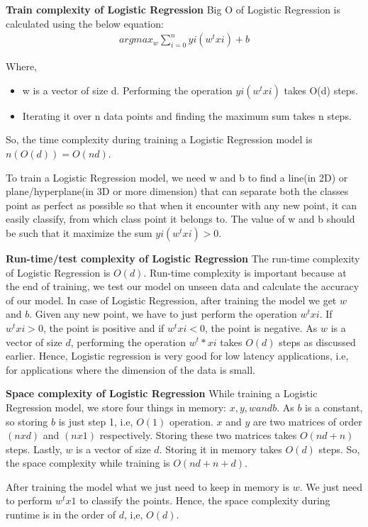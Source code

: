 \documentclass[11pt,english]{article}
\begin{document}
\begin{flushleft}
\textbf{Train complexity of Logistic Regression}
Big O of Logistic Regression is calculated using the below equation:
\begin{align}
    argmax_w\sum_{i=0}^n yi(w^t xi)+b \nonumber
\end{align}

Where,
\begin{itemize}
  \addtolength{\itemindent}{.5cm}
    \item w is a vector of size d. Performing the operation $yi(w^t xi)$ takes O(d) steps.
    \item Iterating it over n data points and finding the maximum sum takes n steps.
\end{itemize}

So, the time complexity during training a Logistic Regression model is $n(O(d))=O(nd)$.\newline

To train a Logistic Regression model, we need w and b to find a line(in 2D) or plane/hyperplane(in 3D or more dimension) that can separate both the classes point as perfect as possible so that when it encounter with any new point, it can easily classify, from which class point it belongs to. The value of w and b should be such that it maximize the sum $yi(w^txi) > 0$.\newline

\textbf{Run-time/test complexity of Logistic Regression}
The run-time complexity of Logistic Regression is $O(d)$.
Run-time complexity is important because at the end of training, we test our model on unseen data and calculate the accuracy of our model. In case of Logistic Regression, after training the model we get $w$ and $b$. Given any new point, we have to just perform the operation $w^t xi$. If $w^t xi > 0$, the point is positive and if $w^t xi<0$, the point is negative. As $w$ is a vector of size $d$, performing the operation $w^t*xi$ takes $O(d)$ steps as discussed earlier. Hence, Logistic regression is very good for low latency applications, i.e, for applications where the dimension of the data is small.\newline

\textbf{Space complexity of Logistic Regression}
While training a Logistic Regression model, we store four things in memory: $x, y, w and b$. As $b$ is a constant, so storing $b$ is just step 1, i.e, $O(1)$ operation. $x$ and $y$ are two matrices of order $(n x d)$ and $(n x 1)$ respectively. Storing these two matrices takes $O(nd + n)$ steps. Lastly, $w$ is a vector of size $d$. Storing it in memory takes $O(d)$ steps. So, the space complexity while training is $O(nd + n +d)$.\newline

After training the model what we just need to keep in memory is $w$. We just need to perform $w^t x1$ to classify the points. Hence, the space complexity during runtime is in the order of $d$, i,e, $O(d)$.
\end{flushleft}
\end{document}
